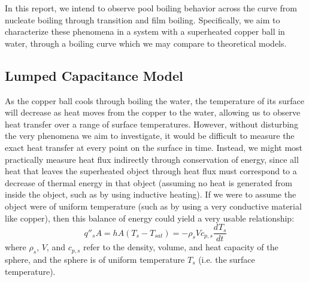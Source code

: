 \documentclass[12pt]{article}
\begin{document}
In this report, we intend to observe pool boiling behavior across the curve from nucleate boiling through transition and film boiling.
Specifically, we aim to characterize these phenomena in a system with a superheated copper ball in water, through a boiling curve which we may compare to theoretical models.

\subsection{Lumped Capacitance Model}
As the copper ball cools through boiling the water, the temperature of its surface will decrease as heat moves from the copper to the water, allowing us to observe heat transfer over a range of surface temperatures.
However, without disturbing the very phenomena we aim to investigate, it would be difficult to measure the exact heat transfer at every point on the surface in time.
Instead, we might most practically measure heat flux indirectly through conservation of energy, since all heat that leaves the superheated object through heat flux must correspond to a decrease of thermal energy in that object (assuming no heat is generated from inside the object, such as by using inductive heating).
If we were to assume the object were of uniform temperature (such as by using a very conductive material like copper), then this balance of energy could yield a very usable relationship:
\newcommand{\deriv}[3]{\frac{d^{#3}#1}{d{#2}^{#3}}}
\begin{equation}
    q''_sA=hA(T_s-T_{sat})=-\rho_s V c_{p,s}\deriv{T_s}{t}{}
\end{equation}
where $\rho_s$, $V$, and $c_{p,s}$ refer to the density, volume, and heat capacity of the sphere, and the sphere is of uniform temperature $T_s$ (i.e. the surface temperature).\\
\end{document}
